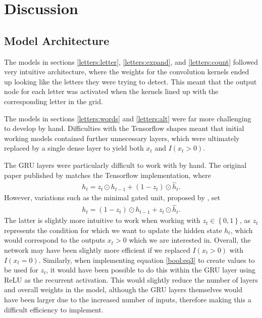 \documentclass{somasmsc}
\begin{document}
\section{Discussion}

\subsection{Model Architecture}

The models in sections \ref{letters:letter}, \ref{letters:expand}, and \ref{letters:count} followed very intuitive architecture, where the weights for the convolution kernels ended up looking like the letters they were trying to detect. This meant that the output node for each letter was activated when the kernels lined up with the corresponding letter in the grid.

The models in sections \ref{letters:words} and \ref{letters:alt} were far more challenging to develop by hand. Difficulties with the Tensorflow shapes meant that initial working models contained further unnecessary layers, which were ultimately replaced by a single dense layer to yield both $x_t$ and $I(x_t > 0)$.

The GRU layers were particularly difficult to work with by hand. The original paper published by \citeauthor{DBLP:journals/corr/ChoMGBSB14} matches the Tensorflow implementation, where 
\begin{align*}
h_t = z_t \odot h_{t-1} + \left(1 - z_t\right) \odot \hat{h}_t.
\end{align*}
However, variations such as the minimal gated unit, proposed by \citet{heck2017simplified}, set
\begin{align*}
h_t = \left(1 - z_t\right) \odot h_{t-1} + z_t \odot \hat{h}_t.
\end{align*}
The latter is slightly more intuitive to work when working with $z_t \in \left\{0, 1\right\}$, as $z_t$ represents the condition for which we want to update the hidden state $h_t$, which would correspond to the outputs $x_t > 0$ which we are interested in. Overall, the network may have been slightly more efficient if we replaced $I(x_t > 0)$ with $I(x_t = 0)$. Similarly, when implementing equation \ref{bool:eq3} to create values to be used for $z_t$, it would have been possible to do this within the GRU layer using ReLU as the recurrent activation. This would slightly reduce the number of layers and overall weights in the model, although the GRU layers themselves would have been larger due to the increased number of inputs, therefore making this a difficult efficiency to implement.
\end{document}
